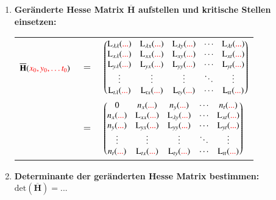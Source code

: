 \begin{enumerate}[itemsep=1ex]
    \item \textbf{Geränderte Hesse Matrix $\overline{\mathbf{H}}$ aufstellen und kritische Stellen einsetzen:}\\
    \begin{tabular}{lll}
        $\overline{\mathbf{H}}({\color{red}x_0,y_0,\ldots t_0})$ &$=$&
        $\left(
            \begin{matrix}
                {{\mathrm{L}_{\lambda\lambda}({\color{red}...})}}&{{\mathrm{L}_{\lambda x}({\color{red}...})}}&{{\mathrm{L}_{\lambda y}({\color{red}...})}}&{\cdots }&{{\mathrm{L}_{\lambda t}({\color{red}...})}}\\
                {{\mathrm{L}_{x\lambda}({\color{red}...})}}&{{\mathrm{L}_{xx}({\color{red}...})}}&{{\mathrm{L}_{xy}({\color{red}...})}}&{\cdots }&{{\mathrm{L}_{xt}({\color{red}...})}}\\
                {{\mathrm{L}_{y\lambda}({\color{red}...})}}&{{\mathrm{L}_{yx}({\color{red}...})}}&{{\mathrm{L}_{yy}({\color{red}...})}}&{\cdots }&{{\mathrm{L}_{yt}({\color{red}...})}}\\
                {\vdots }&{\vdots }&{\vdots }&{\ddots }&{\vdots }\\
                {{\mathrm{L}_{t\lambda}({\color{red}...})}}&{{\mathrm{L}_{tx}({\color{red}...})}}&{{\mathrm{L}_{ty}({\color{red}...})}}&{\cdots }&{{\mathrm{L}_{tt}({\color{red}...})}}\\
            \end{matrix}
        \right)$\\
        &$=$&
        $\left(
            \begin{matrix}
                {{0}}&{{n_{x}({\color{red}...})}}&{{n_{y}({\color{red}...})}}&{\cdots }&{{n_{t}({\color{red}...})}}\\
                {{n_{x}({\color{red}...})}}&{{\mathrm{L}_{xx}({\color{red}...})}}&{{\mathrm{L}_{\lambda y}({\color{red}...})}}&{\cdots }&{{\mathrm{L}_{xt}({\color{red}...})}}\\
                {{n_{y}({\color{red}...})}}&{{\mathrm{L}_{yx}({\color{red}...})}}&{{\mathrm{L}_{yy}({\color{red}...})}}&{\cdots }&{{\mathrm{L}_{yt}({\color{red}...})}}\\
                {\vdots }&{\vdots }&{\vdots }&{\ddots }&{\vdots }\\
                {{n_{t}({\color{red}...})}}&{{\mathrm{L}_{tx}({\color{red}...})}}&{{\mathrm{L}_{ty}({\color{red}...})}}&{\cdots }&{{\mathrm{L}_{tt}({\color{red}...})}}\\
            \end{matrix}
        \right)$
    \end{tabular}

    \item \textbf{Determinante der geränderten Hesse Matrix bestimmen:}\\
    $\text{det}\left(\overline{\mathbf{H}}\right) = ... $


\end{enumerate}
